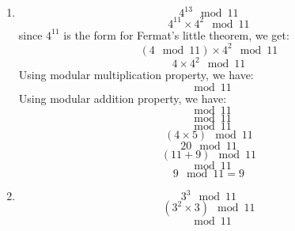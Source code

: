 \documentclass[10pt,a4paper,oneside]{article}
\begin{document}
\begin{enumerate}
\item 
\begin{equation}
4^{13} \mod 11
\end{equation}
\begin{equation}
4^{11} \times 4^2 \mod 11
\end{equation}
since \( 4^{11} \) is the form for Fermat's little theorem, we get:
\begin{equation}
(4 \mod 11)\times 4^2 \mod 11
\end{equation}
\begin{equation}
4 \times 4^2 \mod 11
\end{equation}
Using modular multiplication property, we have:
\begin{equation}
[ (4 \mod 11) \times (16 \mod 11) ] \mod 11
\end{equation}
Using modular addition property, we have:
\begin{equation}
[ (4 \mod 11) \times ( (11+5)\mod 11) ] \mod 11
\end{equation}
\begin{equation}
[ (4 \mod 11) \times ( (11 \mod 11 + 5 \mod 11)\mod 11) ] \mod 11
\end{equation}
\begin{equation}
[ (4 \mod 11) \times ( 5\mod 11) ] \mod 11
\end{equation}
\begin{equation}
(4 \times 5 ) \mod 11
\end{equation}
\begin{equation}
20 \mod 11
\end{equation}
\begin{equation}
(11 + 9) \mod 11
\end{equation}
\begin{equation}
[ (11 \mod 11) + (9 \mod 11)] \mod 11
\end{equation}
\begin{equation}
9 \mod 11 = 9
\end{equation}
\item 
\begin{equation}
3^3 \mod 11
\end{equation}
\begin{equation}
(3^2 \times 3) \mod 11
\end{equation}
\begin{equation}
[ (9 \mod 11) \times (3 \mod 11) ] \mod 11
\end{equation}
\begin{equation}

\end{equation}
\end{enumerate}
\end{document}
